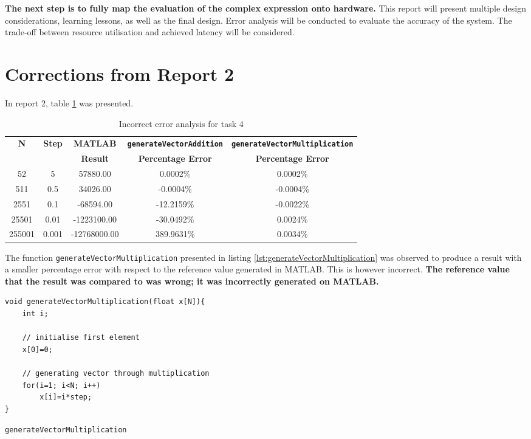 \documentclass{article}
\begin{document}
\textbf{The next step is to fully map the evaluation of the complex expression onto hardware.} This report will present multiple design considerations, learning lessons, as well as the final design. Error analysis will be conducted to evaluate the accuracy of the system. The trade-off between resource utilisation and achieved latency will be considered.

\section{Corrections from Report 2}
In report 2, table \ref{tab:report_2_erronous_table} was presented. 

\begin{table}[H]
  \centering
    \begin{tabular}{|c|c|c|c|c|}
    \hline
    \multirow{2}{*}{\textbf{N}} & \multirow{2}{*}{\textbf{Step}} & \textbf{MATLAB} & \textbf{{\tt generateVectorAddition}} & \textbf{{\tt generateVectorMultiplication}} \\
    \cline{4-5}          &       & \textbf{Result} & \textbf{Percentage Error} & \textbf{Percentage Error} \\
    \hline
    52    & 5     & 57880.00 & 0.0002\% & 0.0002\% \\
    \hline
    511   & 0.5   & 34026.00 & -0.0004\% & -0.0004\% \\
    \hline
    2551  & 0.1   & -68594.00 & -12.2159\% & -0.0022\% \\
    \hline
    25501 & 0.01  & -1223100.00 & -30.0492\% & 0.0024\% \\
    \hline
    255001 & 0.001 & -12768000.00 & 389.9631\% & 0.0034\% \\
    \hline
    \end{tabular}%
  \caption{Incorrect error analysis for task 4}
  \label{tab:report_2_erronous_table}
\end{table}%
  
The function {\tt generateVectorMultiplication} presented in listing \ref{lst:generateVectorMultiplication} was observed to produce a result with a smaller percentage error with respect to the reference value generated in MATLAB. This is however incorrect. \textbf{The reference value that the result was compared to was wrong; it was incorrectly generated on MATLAB.}

\begin{listing}[H]
\begin{verbatim}
void generateVectorMultiplication(float x[N]){
	int i;
	
	// initialise first element
	x[0]=0;
	
	// generating vector through multiplication
	for(i=1; i<N; i++)
		x[i]=i*step;
}
\end{verbatim}
\caption{{\tt generateVectorMultiplication}} 
\label{lst:generateVectorMultiplication}
\end{listing}
\end{document}
